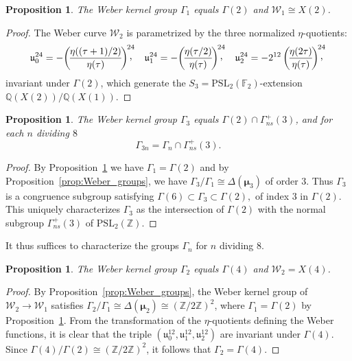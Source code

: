 \documentclass{amsart}
\newcommand{\cW}{\mathcal{W}}
\newcommand{\FF}{\mathbb{F}}
\newcommand{\QQ}{\mathbb{Q}}
\newcommand{\ZZ}{\mathbb{Z}}
\newcommand{\PSL}{\mathrm{PSL}}
\newcommand{\isom}{\cong}
\newcommand{\uu}{\mathfrak{u}}
\newcommand{\ccomma}{\raisebox{0.4ex}{,}}
\newcommand{\mmu}{\boldsymbol{\mu}}
\newtheorem{proposition}[theorem]{Proposition}
\begin{document}
\begin{proposition}
  \label{prop:Weber_group1}
  The Weber kernel group $\Gamma_1$ equals $\Gamma(2)$ and $\cW_1 \isom X(2)$.
\end{proposition}

\begin{proof}
  The Weber curve $\cW_2$ is parametrized by the three normalized $\eta$-quotients:
  $$
  \uu_0^{24} = -{\left(\!\frac{\eta((\tau+1)/2)}{\eta(\tau)}\!\right)\ccomma}^{\!\!\!\!24}\quad
  \uu_1^{24} = -{\left(\!\frac{\eta(\tau/2)}{\eta(\tau)}\!\right)\ccomma}^{\!\!\!\!24}\quad
  \uu_2^{24} = -{2^{12}\left(\!\frac{\eta(2\tau)}{\eta(\tau)}\!\right)\ccomma}^{\!\!\!\!24}
  $$
  invariant under $\Gamma(2)$, which generate the $S_3 = \PSL_2(\FF_2)$-extension $\QQ(X(2))/\QQ(X(1))$.
\end{proof}

\begin{proposition}
  \label{prop:Weber_group3}
  The Weber kernel group $\Gamma_3$ equals $\Gamma(2) \cap \Gamma_{ns}^+(3)$,
  and for each $n$ dividing $8$
  $$
  \Gamma_{3n} = \Gamma_n \cap \Gamma_{ns}^+(3).
  $$
\end{proposition}

\begin{proof}
  By Proposition~\ref{prop:Weber_group1} we have $\Gamma_1 = \Gamma(2)$ and
  by Proposition~\ref{prop:Weber_groups}, we have $\Gamma_3/\Gamma_1 \isom \Delta(\mmu_3)$
  of order $3$. Thus $\Gamma_3$ is a congruence subgroup satisfying
  $
  \Gamma(6) \subset \Gamma_3 \subset \Gamma(2),
  $
  of index $3$ in $\Gamma(2)$. This uniquely characterizes $\Gamma_3$ as
  the intersection of $\Gamma(2)$ with the normal subgroup
  $\Gamma_{ns}^+(3)$ of $\PSL_2(\ZZ)$.
\end{proof}

\noindent
It thus suffices to characterize the groups $\Gamma_n$ for $n$ dividing $8$.

\begin{proposition}
  \label{prop:Weber_group2}
  The Weber kernel group $\Gamma_2$ equals $\Gamma(4)$ and $\cW_2 = X(4)$.
\end{proposition}

\begin{proof}
  By Proposition~\ref{prop:Weber_groups}, the Weber kernel group of $\cW_2 \to \cW_1$
  satisfies $\Gamma_2/\Gamma_1 \isom \Delta(\mmu_2) \isom (\ZZ/2\ZZ)^2$, where
  $\Gamma_1 = \Gamma(2)$ by Proposition~\ref{prop:Weber_group1}.
  From the transformation of the $\eta$-quotients defining the Weber functions, it is
  clear that the triple $(\uu_0^{12},\uu_1^{12},\uu_2^{12})$ are invariant under $\Gamma(4)$.
  Since $\Gamma(4)/\Gamma(2) \isom (\ZZ/2\ZZ)^2$, it follows that $\Gamma_2 = \Gamma(4)$.
\end{proof}
\end{document}
